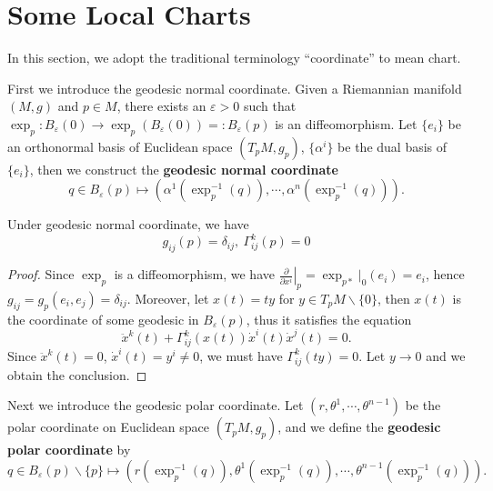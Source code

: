 \section{Some Local Charts}
In this section, we adopt the traditional terminology ``coordinate'' to mean chart.

First we introduce the geodesic normal coordinate.
Given a Riemannian manifold $(M,g)$ and $p\in M$, there exists an $\varepsilon>0$ such that $\exp_p:B_\varepsilon(0)\to\exp_p(B_\varepsilon(0))=:B_\varepsilon(p)$ is an diffeomorphism.
Let $\{e_i\}$ be an orthonormal basis of Euclidean space $(T_pM,g_p)$, $\{\alpha^i\}$ be the dual basis of $\{e_i\}$, then we construct the \textbf{geodesic normal coordinate}
\[q\in B_\varepsilon(p)\mapsto(\alpha^1(\exp_p^{-1}(q)),\cdots,\alpha^n(\exp_p^{-1}(q))).\]

\begin{prop}
    Under geodesic normal coordinate, we have
    \[g_{ij}(p)=\delta_{ij},\ \Gamma^k_{ij}(p)=0\]
\end{prop}
\begin{proof}
    Since $\exp_p$ is a diffeomorphism, we have $\left.\frac{\partial{}}{\partial{x^i}}\right|_p=\exp_{p*}|_0(e_i)=e_i$, hence $g_{ij}=g_p(e_i,e_j)=\delta_{ij}$.
    Moreover, let $x(t)=ty$ for $y\in T_pM\backslash\{0\}$, then $x(t)$ is the coordinate of some geodesic in $B_\varepsilon(p)$, thus it satisfies the equation
    \[\ddot{x}^k(t)+\Gamma^k_{ij}(x(t))\dot{x}^i(t)\dot{x}^j(t)=0.\]
    Since $\ddot{x}^k(t)=0$, $\dot{x}^i(t)=y^i\neq 0$, we must have $\Gamma^k_{ij}(ty)=0$.
    Let $y\to 0$ and we obtain the conclusion.
\end{proof}

Next we introduce the geodesic polar coordinate.
Let $(r,\theta^1,\cdots,\theta^{n-1})$ be the polar coordinate on Euclidean space $(T_pM,g_p)$, and we define the \textbf{geodesic polar coordinate} by
\[q\in B_\varepsilon(p)\backslash\{p\}\mapsto(r(\exp_p^{-1}(q)),\theta^1(\exp_p^{-1}(q)),\cdots,\theta^{n-1}(\exp_p^{-1}(q))).\]

